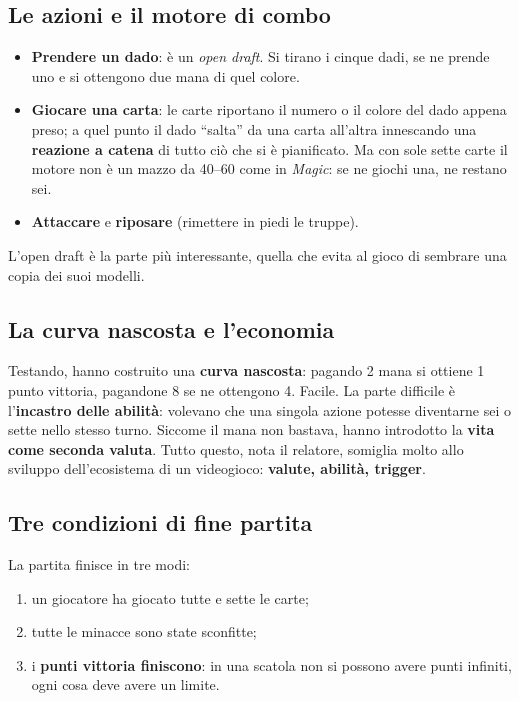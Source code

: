 \subsection{Le azioni e il motore di combo}

\begin{itemize}
  \item \textbf{Prendere un dado}: è un \emph{open draft}. Si tirano i cinque dadi,
        se ne prende uno e si ottengono due mana di quel colore.
  \item \textbf{Giocare una carta}: le carte riportano il numero o il colore del
        dado appena preso; a quel punto il dado ``salta'' da una carta all'altra
        innescando una \textbf{reazione a catena} di tutto ciò che si è pianificato.
        Ma con sole sette carte il motore non è un mazzo da 40--60 come in
        \emph{Magic}: se ne giochi una, ne restano sei.
  \item \textbf{Attaccare} e \textbf{riposare} (rimettere in piedi le truppe).
\end{itemize}
L'open draft è la parte più interessante, quella che evita al gioco di sembrare una
copia dei suoi modelli.

\subsection{La curva nascosta e l'economia}

Testando, hanno costruito una \textbf{curva nascosta}: pagando 2 mana si ottiene 1
punto vittoria, pagandone 8 se ne ottengono 4. Facile. La parte difficile è
l'\textbf{incastro delle abilità}: volevano che una singola azione potesse
diventarne sei o sette nello stesso turno. Siccome il mana non bastava, hanno
introdotto la \textbf{vita come seconda valuta}. Tutto questo, nota il relatore,
somiglia molto allo sviluppo dell'ecosistema di un videogioco: \textbf{valute,
abilità, trigger}.

\subsection{Tre condizioni di fine partita}

La partita finisce in tre modi:
\begin{enumerate}
  \item un giocatore ha giocato tutte e sette le carte;
  \item tutte le minacce sono state sconfitte;
  \item i \textbf{punti vittoria finiscono}: in una scatola non si possono avere
        punti infiniti, ogni cosa deve avere un limite.
\end{enumerate}

